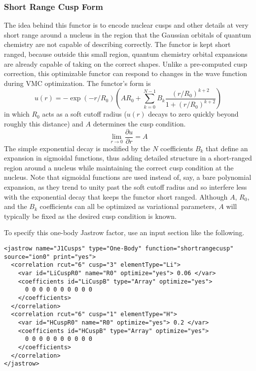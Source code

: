 \subsubsection{Short Range Cusp Form}
\label{sec:onebodyjastrowsrcusp}

The idea behind this functor is to encode nuclear cusps and other details at very
short range around a nucleus in the region that the Gaussian orbitals of quantum
chemistry are not capable of describing correctly.
The functor is kept short ranged, because outside this small region, quantum chemistry
orbital expansions are already capable of taking on the correct shapes.
Unlike a pre-computed cusp correction, this optimizable functor can respond to
changes in the wave function during VMC optimization.
The functor's form is
\begin{equation}
\label{srcuspform}
u(r) = -\exp{\left(-r/R_0\right)} \left( A R_0 + \sum_{k=0}^{N-1} B_k \frac{ (r/R_0)^{k+2} }{ 1 + (r/R_0)^{k+2} } \right)
\end{equation}
in which $R_0$ acts as a soft cutoff radius ($u(r)$ decays to zero quickly beyond roughly this distance)
and $A$ determines the cusp condition.
\begin{equation}
\label{srcusplimit}
\lim_{r \to 0} \frac{\partial u}{\partial r} = A
\end{equation}
The simple exponential decay is modified by the $N$ coefficients $B_k$ that define
an expansion in sigmoidal functions, thus adding detailed structure in a short-ranged
region around a nucleus while maintaining the correct cusp condition at the nucleus.
Note that sigmoidal functions are used instead of, say, a bare polynomial expansion, as they
trend to unity past the soft cutoff radius and so interfere less with the exponential decay
that keeps the functor short ranged.
Although $A$, $R_0$, and the $B_k$ coefficients can all be optimized as variational
parameters, $A$ will typically be fixed as the desired cusp condition is known.

To specify this one-body Jastrow factor, use an input section like the following.

\begin{lstlisting}[style=QMCPXML]
<jastrow name="J1Cusps" type="One-Body" function="shortrangecusp" source="ion0" print="yes">
  <correlation rcut="6" cusp="3" elementType="Li">
    <var id="LiCuspR0" name="R0" optimize="yes"> 0.06 </var>
    <coefficients id="LiCuspB" type="Array" optimize="yes">
      0 0 0 0 0 0 0 0 0 0
    </coefficients>
  </correlation>
  <correlation rcut="6" cusp="1" elementType="H">
    <var id="HCuspR0" name="R0" optimize="yes"> 0.2 </var>
    <coefficients id="HCuspB" type="Array" optimize="yes">
      0 0 0 0 0 0 0 0 0 0
    </coefficients>
  </correlation>
</jastrow>
\end{lstlisting}

